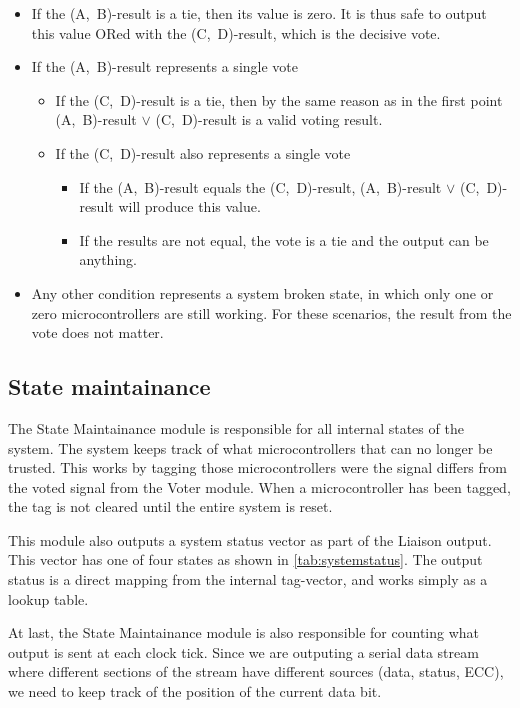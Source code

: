 \begin{itemize}
\item If the (A,~B)-result is a tie, then its value is zero. It is
  thus safe to output this value ORed with the (C,~D)-result, which is
  the decisive vote.

\item If the (A,~B)-result represents a single vote
  \begin{itemize}
  \item If the (C,~D)-result is a tie, then by the same reason as in
    the first point (A,~B)-result $\vee$ (C,~D)-result is a valid
    voting result.

  \item If the (C,~D)-result also represents a single vote
    \begin{itemize}
    \item If the (A,~B)-result equals the (C,~D)-result, (A,~B)-result
      $\vee$ (C,~D)-result will produce this value.
    \item If the results are not equal, the vote is a tie and the
      output can be anything.
    \end{itemize}
  \end{itemize}

\item Any other condition represents a system broken state, in which
  only one or zero microcontrollers are still working. For these
  scenarios, the result from the vote does not matter.

\end{itemize}

\subsection{State maintainance}
The State Maintainance module is responsible for all internal states
of the system. The system keeps track of what microcontrollers that
can no longer be trusted. This works by tagging those microcontrollers
were the signal differs from the voted signal from the Voter
module. When a microcontroller has been tagged, the tag is not cleared
until the entire system is reset.

This module also outputs a system status vector as part of the Liaison
output. This vector has one of four states as shown in
\autoref{tab:systemstatus}.  The output status is a direct mapping
from the internal tag-vector, and works simply as a lookup table.

At last, the State Maintainance module is also responsible for
counting what output is sent at each clock tick. Since we are
outputing a serial data stream where different sections of the stream
have different sources (data, status, ECC), we need to keep track of
the position of the current data bit.



